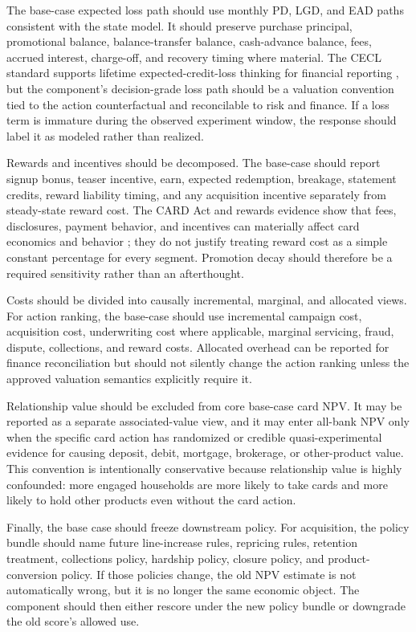 \documentclass[11pt]{article}
\newcommand{\1}{\mathbf{1}}
\begin{document}
The base-case expected loss path should use monthly PD, LGD, and EAD paths
consistent with the state model. It should preserve purchase principal,
promotional balance, balance-transfer balance, cash-advance balance, fees,
accrued interest, charge-off, and recovery timing where material. The CECL
standard supports lifetime expected-credit-loss thinking for financial
reporting \citep{fasb2016asu201613}, but the component's decision-grade loss
path should be a valuation convention tied to the action counterfactual and
reconcilable to risk and finance. If a loss term is immature during the
observed experiment window, the response should label it as modeled rather
than realized.

Rewards and incentives should be decomposed. The base-case should report
signup bonus, teaser incentive, earn, expected redemption, breakage, statement
credits, reward liability timing, and any acquisition incentive separately
from steady-state reward cost. The CARD Act and rewards evidence show that
fees, disclosures, payment behavior, and incentives can materially affect card
economics and behavior \citep{agarwal2013cardact,agarwal2010rewards}; they do
not justify treating reward cost as a simple constant percentage for every
segment. Promotion decay should therefore be a required sensitivity rather
than an afterthought.

Costs should be divided into causally incremental, marginal, and allocated
views. For action ranking, the base-case should use incremental campaign cost,
acquisition cost, underwriting cost where applicable, marginal servicing,
fraud, dispute, collections, and reward costs. Allocated overhead can be
reported for finance reconciliation but should not silently change the action
ranking unless the approved valuation semantics explicitly require it.

Relationship value should be excluded from core base-case card NPV. It may be
reported as a separate associated-value view, and it may enter all-bank NPV
only when the specific card action has randomized or credible
quasi-experimental evidence for causing deposit, debit, mortgage, brokerage,
or other-product value. This convention is intentionally conservative because
relationship value is highly confounded: more engaged households are more
likely to take cards and more likely to hold other products even without the
card action.

Finally, the base case should freeze downstream policy. For acquisition, the
policy bundle should name future line-increase rules, repricing rules,
retention treatment, collections policy, hardship policy, closure policy, and
product-conversion policy. If those policies change, the old NPV estimate is
not automatically wrong, but it is no longer the same economic object. The
component should then either rescore under the new policy bundle or downgrade
the old score's allowed use.
\end{document}
